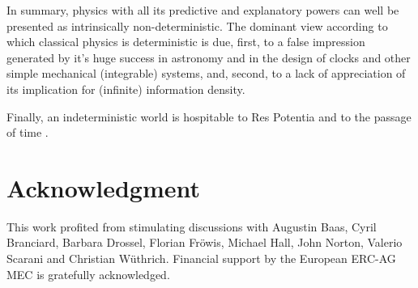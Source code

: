 \documentclass[pra,aps,groupedaddress,twocolumn,floatfix,nofootinbib]{revtex4}
\begin{document}
In summary, physics with all its predictive and explanatory powers can well be presented as intrinsically non-deterministic. The dominant view according to which classical physics is deterministic is due, first, to a false impression generated by it's huge success in astronomy and in the design of clocks and other simple mechanical (integrable) systems, and, second, to a lack of appreciation of its implication for (infinite) information density. 

Finally, an indeterministic world is hospitable to Res Potentia and to the passage of time \cite{GisinTimePasses,past,DolevPassage}. \\


\small
\section*{Acknowledgment} This work profited from stimulating discussions with Augustin Baas, Cyril Branciard, Barbara Drossel, Florian Fr\"owis, Michael Hall, John Norton, Valerio Scarani and Christian W\"uthrich. Financial support by the European ERC-AG MEC is gratefully acknowledged.\\ \\
\end{document}

